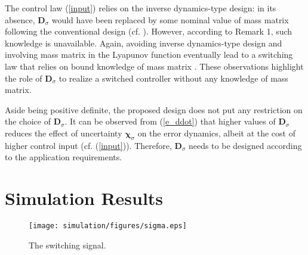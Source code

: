 \documentclass[AMA,STIX1COL,sort, compress]{WileyNJD-v2}
\begin{document}
\begin{remark}\label{select_d}
	The control law (\ref{input}) relies on the inverse dynamics-type design: in its absence, $\mathbf D_\sigma$ would have been replaced by some nominal value of mass matrix following the conventional design (cf. \cite{roy2019simultaneous,roy2019overcoming}). However, according to Remark 1, such knowledge is unavailable. Again, avoiding inverse dynamics-type design and involving mass matrix in the Lyapunov function eventually lead to a switching law that relies on bound knowledge of mass matrix \cite{roy2019reduced}. These observations highlight the role of $\mathbf D_\sigma$ to realize a switched controller without any knowledge of mass matrix.
	
	Aside being positive definite, the proposed design does not put any restriction on the choice of $\mathbf{D}_\sigma$. It can be observed from (\ref{e_ddot}) that higher values of $\mathbf{D}_\sigma$ reduces the effect of uncertainty $\boldsymbol \chi_\sigma$ on the error dynamics, albeit at the cost of higher control input (cf. (\ref{input})). Therefore, $\mathbf{D}_\sigma$ needs to be designed according to the application requirements. 
\end{remark}
\section{Simulation Results}
\begin{figure}[!t]
	\centering
	\texttt{[image: simulation/figures/sigma.eps]}%
	\caption{{The switching signal.}}\label{fig:1} %
\end{figure}
\end{document}

